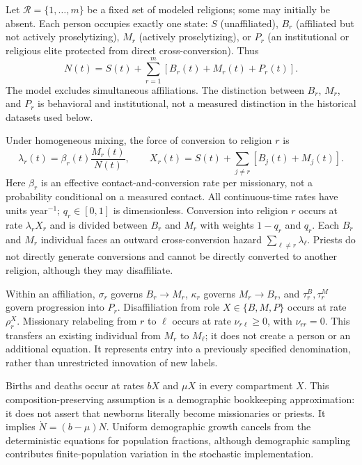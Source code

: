 \documentclass[11pt,a4paper]{article}
\begin{document}
Let $\mathcal R=\{1,\ldots,m\}$ be a fixed set of modeled religions; some may initially be absent. Each person occupies exactly one state: $S$ (unaffiliated), $B_r$ (affiliated but not actively proselytizing), $M_r$ (actively proselytizing), or $P_r$ (an institutional or religious elite protected from direct cross-conversion). Thus
\begin{equation}
N(t)=S(t)+\sum_{r=1}^m[B_r(t)+M_r(t)+P_r(t)].
\end{equation}
The model excludes simultaneous affiliations. The distinction between $B_r$, $M_r$, and $P_r$ is behavioral and institutional, not a measured distinction in the historical datasets used below.

Under homogeneous mixing, the force of conversion to religion $r$ is
\begin{equation}
\lambda_r(t)=\beta_r(t)\frac{M_r(t)}{N(t)},\qquad
X_r(t)=S(t)+\sum_{j\ne r}[B_j(t)+M_j(t)].
\label{eq:force}
\end{equation}
Here $\beta_r$ is an effective contact-and-conversion rate per missionary, not a probability conditional on a measured contact. All continuous-time rates have units year$^{-1}$; $q_r\in[0,1]$ is dimensionless. Conversion into religion $r$ occurs at rate $\lambda_rX_r$ and is divided between $B_r$ and $M_r$ with weights $1-q_r$ and $q_r$. Each $B_r$ and $M_r$ individual faces an outward cross-conversion hazard $\sum_{\ell\ne r}\lambda_\ell$. Priests do not directly generate conversions and cannot be directly converted to another religion, although they may disaffiliate.

Within an affiliation, $\sigma_r$ governs $B_r\to M_r$, $\kappa_r$ governs $M_r\to B_r$, and $\tau_r^B,\tau_r^M$ govern progression into $P_r$. Disaffiliation from role $X\in\{B,M,P\}$ occurs at rate $\rho_r^X$. Missionary relabeling from $r$ to $\ell$ occurs at rate $\nu_{r\ell}\geq0$, with $\nu_{rr}=0$. This transfers an existing individual from $M_r$ to $M_\ell$; it does not create a person or an additional equation. It represents entry into a previously specified denomination, rather than unrestricted innovation of new labels.

Births and deaths occur at rates $bX$ and $\mu X$ in every compartment $X$. This composition-preserving assumption is a demographic bookkeeping approximation: it does not assert that newborns literally become missionaries or priests. It implies $\dot N=(b-\mu)N$. Uniform demographic growth cancels from the deterministic equations for population fractions, although demographic sampling contributes finite-population variation in the stochastic implementation.
\end{document}
